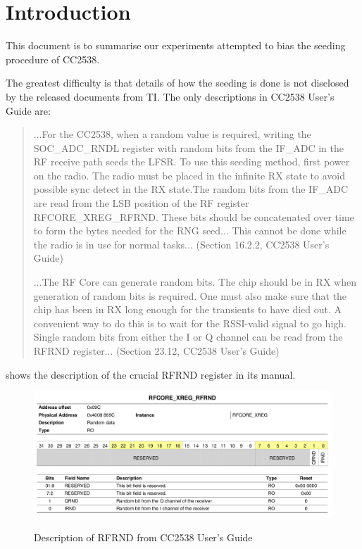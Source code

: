\section{Introduction}

This document is to summarise our experiments attempted to bias the seeding procedure of CC2538\cite{CC2538_Manual}.

The greatest difficulty is that details of how the seeding is done is not disclosed by the released documents from TI. The only descriptions in CC2538 User's Guide are:
\begin{quote}
...For the CC2538, when a random value is required, writing the SOC\_ADC\_RNDL register with random bits from the IF\_ADC in the RF receive path seeds the LFSR. To use this seeding method, first power on the radio. The radio must be placed in the infinite RX state to avoid possible sync detect in the RX state.The random bits from the IF\_ADC are read from the LSB position of the RF register RFCORE\_XREG\_RFRND. These bits should be concatenated over time to form the bytes needed for the RNG seed... This cannot be done while the radio is in use for normal tasks... (Section 16.2.2, CC2538 User's Guide)

...The RF Core can generate random bits. The chip should be in RX when generation of random bits is required. One must also make sure that the chip has been in RX long enough for the transients to have died out. A convenient way to do this is to wait for the RSSI-valid signal to go high. Single random bits from either the I or Q channel can be read from the RFRND register... (Section 23.12, CC2538 User's Guide)
\end{quote}

 shows the description of the crucial RFRND register in its manual.

\begin{figure}[ht!]
\center
\caption{Description of RFRND from CC2538 User's Guide}
\includegraphics[width=\linewidth]{./figures/CC2538_RFRND.png}
\label{CC2538_RFRND}
\end{figure}

